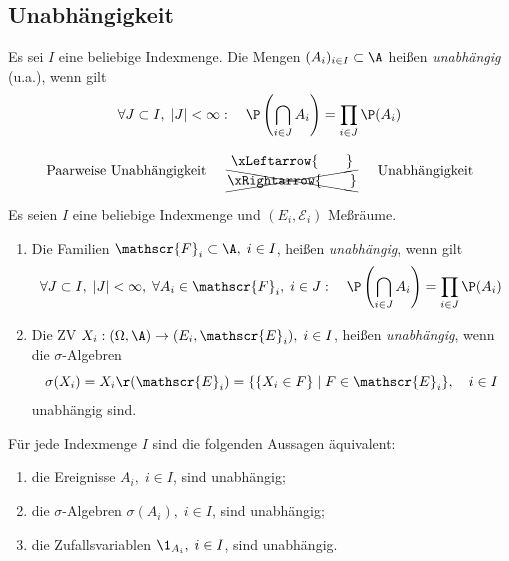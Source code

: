\documentclass[11pt, a4paper]{article}
\begin{document}
\subsection{Unabhängigkeit}

\begin{definition}\Theorem
    Es sei $I$ eine beliebige Indexmenge. Die Mengen $(A_i)_{i\in I} \subset \A$ heißen \emph{unabhängig} (u.a.), wenn gilt
    $$\forall J \subset I, \; |J| < \infty: \quad \P\left(\bigcap_{i\in J} A_i\right) = \prod_{i\in J} \P(A_i)$$
\end{definition}

\begin{note}
$$ \text{Paarweise Unabhängigkeit} \quad \begin{array}{c}
     \xLeftarrow{\qquad }  \\
     \xcancel{\xRightarrow{\qquad }}
\end{array} \quad \text{Unabhängigkeit} $$
\end{note}

\begin{definition}
    Es seien $I$ eine beliebige Indexmenge und $(E_i, \mathscr{E}_i)$ Meßräume.
    \begin{enumerate}[label=\alph*)]
        \item Die Familien $\mathscr{F}_i \subset \A, \; i \in I$, heißen \emph{unabhängig}, wenn gilt
        $$\forall J \subset I, \; |J| < \infty, \; \forall A_i \in \mathscr{F}_i, \; i \in J: \quad \P\left(\bigcap_{i\in J} A_i\right) = \prod_{i\in J} \P(A_i)$$
        \item Die ZV $X_i: (\Omega, \A) \to (E_i, \mathscr{E}_i), \; i \in I$, heißen \emph{unabhängig}, wenn die $\sigma$-Algebren
        $$\sigma(X_i) = X_i\r(\mathscr{E}_i) = \{\{X_i \in F\} \mid F \in \mathscr{E}_i\}, \quad i \in I$$
        unabhängig sind.
    \end{enumerate}
\end{definition}


\begin{lemma}
    Für jede Indexmenge $I$ sind die folgenden Aussagen äquivalent:
    \begin{enumerate}[label=\alph*)]
        \item die Ereignisse $A_i, \; i \in I$, sind unabhängig;
        \item die $\sigma$-Algebren $\sigma(A_i), \; i \in I$, sind unabhängig;
        \item die Zufallsvariablen $\1_{A_i}, \; i \in I$, sind unabhängig.
    \end{enumerate}
\end{lemma}
\end{document}
